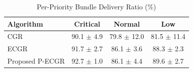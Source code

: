 \begin{table}[t]
\centering
\caption{Per-Priority Bundle Delivery Ratio (\%)}
\label{tab:priority}
\begin{tabular}{lccc}
\hline
\textbf{Algorithm} & \textbf{Critical} & \textbf{Normal} & \textbf{Low} \\
\hline
CGR & 90.1 $\pm$ 4.9 & 79.8 $\pm$ 12.0 & 81.5 $\pm$ 11.4 \\
ECGR & 91.7 $\pm$ 2.7 & 86.1 $\pm$ 3.6 & 88.3 $\pm$ 2.3 \\
Proposed P-ECGR & 92.7 $\pm$ 1.0 & 86.1 $\pm$ 4.4 & 89.6 $\pm$ 2.7 \\
\hline
\end{tabular}
\end{table}
